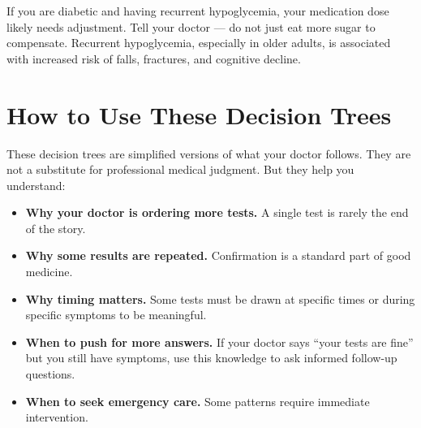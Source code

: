 If you are diabetic and having recurrent hypoglycemia, your medication dose likely needs adjustment. Tell your doctor --- do not just eat more sugar to compensate. Recurrent hypoglycemia, especially in older adults, is associated with increased risk of falls, fractures, and cognitive decline.

\clearpage
\section{How to Use These Decision Trees}

These decision trees are simplified versions of what your doctor follows. They are not a substitute for professional medical judgment. But they help you understand:

\begin{itemize}
    \item \textbf{Why your doctor is ordering more tests.} A single test is rarely the end of the story.
    \item \textbf{Why some results are repeated.} Confirmation is a standard part of good medicine.
    \item \textbf{Why timing matters.} Some tests must be drawn at specific times or during specific symptoms to be meaningful.
    \item \textbf{When to push for more answers.} If your doctor says ``your tests are fine'' but you still have symptoms, use this knowledge to ask informed follow-up questions.
    \item \textbf{When to seek emergency care.} Some patterns require immediate intervention.
\end{itemize}
